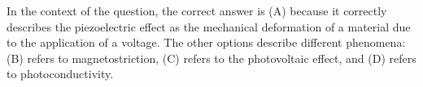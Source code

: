 In the context of the question, the correct answer is (A) because it correctly describes the piezoelectric effect as the mechanical deformation of a material due to the application of a voltage. The other options describe different phenomena: (B) refers to magnetostriction, (C) refers to the photovoltaic effect, and (D) refers to photoconductivity.

